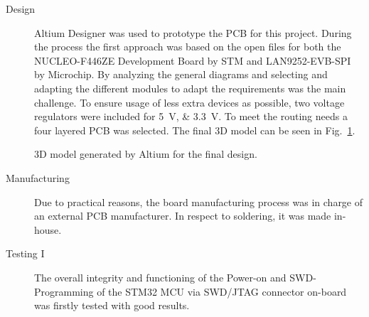 \begin{description}
\item[Design] Altium Designer was used to prototype the PCB for this project. During the process the first approach was
                based on the open files for both the NUCLEO-F446ZE Development Board by STM and LAN9252-EVB-SPI by Microchip. By analyzing
                the general diagrams and selecting and adapting the different modules to adapt the requirements was the main challenge. To ensure
                usage of less extra devices as possible, two voltage regulators were included for \SIlist{5;3.3}{\volt}.
                To meet the routing needs a four layered PCB was selected. The final 3D model can be seen in Fig.~\ref{fig:pcb3d}.
\end{description}

\begin{figure}[ht]
    \centering
    \hfill
    \caption{3D model generated by Altium for the final design.}
    \label{fig:pcb3d}
\end{figure}


\begin{description}
\item[Manufacturing]    Due to practical reasons, the board manufacturing process was in charge of an external PCB manufacturer. In respect
                to soldering, it was made in-house.

\item[Testing I] The overall integrity and functioning of the Power-on and SWD-Programming of the STM32 MCU via SWD/JTAG connector on-board was firstly tested with good results. 
\end{description}


